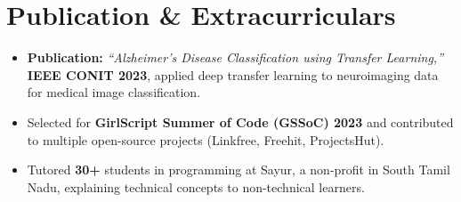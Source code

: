 \documentclass[letterpaper,10pt]{article}
\begin{document}
\section{Publication \& Extracurriculars}
\begin{itemize}[leftmargin=0.18in, itemsep=0pt, topsep=1pt]
  \item\small \textbf{Publication:} \textit{``Alzheimer's Disease Classification using Transfer Learning,''} \textbf{IEEE CONIT 2023}, applied deep transfer learning to neuroimaging data for medical image classification.
  \item\small Selected for \textbf{GirlScript Summer of Code (GSSoC) 2023} and contributed to multiple open-source projects (Linkfree, Freehit, ProjectsHut).
  \item\small Tutored \textbf{30+} students in programming at Sayur, a non-profit in South Tamil Nadu, explaining technical concepts to non-technical learners.
\end{itemize}
\vspace{-6pt}
\end{document}
